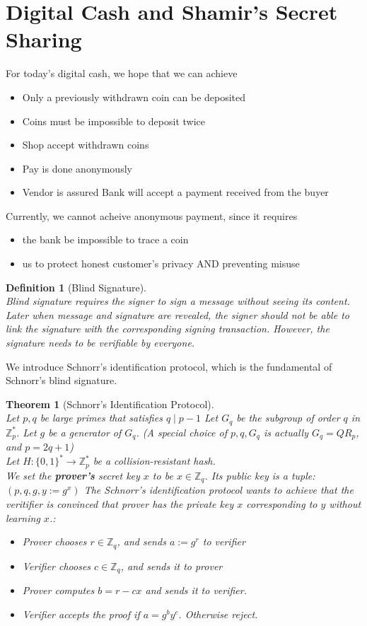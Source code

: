 \documentclass[12pt]{article}
\newtheorem{definition}{Definition}[section]
\newtheorem{theorem}{Theorem}[section]
\theoremstyle{definition}
\begin{document}
\section{Digital Cash and Shamir's Secret Sharing}
For today's digital cash, we hope that we can achieve
\begin{itemize}
  \item Only a previously withdrawn coin can be deposited
  \item Coins must be impossible to deposit twice
  \item Shop accept withdrawn coins
  \item Pay is done anonymously
  \item Vendor is assured Bank will accept a payment received from the buyer
\end{itemize}
Currently, we cannot acheive anonymous payment, since it requires 
\begin{itemize}
\item the bank be impossible to trace a coin
\item us to protect honest customer's privacy AND preventing misuse
\end{itemize}
\begin{definition}[Blind Signature]
\hfill\\\normalfont Blind signature requires the signer to sign a message \textit{without} seeing its content. Later when message and signature are revealed, the signer should not be able to link the signature with the corresponding signing transaction. However, the signature needs to be verifiable by everyone.
\end{definition}
We introduce Schnorr's identification protocol, which is the fundamental of Schnorr's blind signature.
\begin{theorem}[Schnorr's Identification Protocol]
\hfill\\\normalfont Let $p,q$ be large primes that satisfies
$
q\mid p-1
$
Let $G_q$ be the subgroup of order $q$ in $\mathbb{Z}_p^\ast$. Let $g$ be a generator of $G_q$. (A special choice of $p,q,G_q$ is actually $G_q=QR_p$, and $p=2q+1$)\\
Let $H:\{0,1\}^\ast\to\mathbb{Z}_p^\ast$ be a collision-resistant hash.\\
We set the \textbf{prover's} secret key $x$ to be $x\in\mathbb{Z}_q$. Its public key is a tuple:
$
(p,q,g,y:=g^x)
$
The Schnorr's identification protocol wants to achieve that the veritifier is convinced that prover has the private key $x$ corresponding to $y$ without learning $x$.:
\begin{itemize}
  \item Prover chooses $r\in \mathbb{Z}_q$, and sends $a:=g^r$ to verifier
  \item Verifier chooses $c\in\mathbb{Z}_q$, and sends it to prover
  \item Prover computes $b=r-cx$ and sends it to verifier.
  \item Verifier accepts the proof if $a=g^by^c$. Otherwise reject.
\end{itemize}
\end{theorem}
\end{document}
